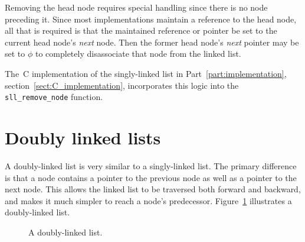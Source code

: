 \documentclass{article}
\begin{document}
  Removing the head node requires special handling since there is no node preceding it. Since most implementations maintain a reference to the head node, all that is required is that the maintained reference or pointer be set to the current head node's \emph{next} node. Then the former head node's \emph{next} pointer may be set to $\phi$ to completely disassociate that node from the linked list.

  The~C implementation of the singly-linked list in Part~\ref{part:implementation}, section~\ref{sect:C_implementation}, incorporates this logic into the \verb|sll_remove_node| function.

  \section{Doubly linked lists}
  A doubly-linked list is very similar to a singly-linked list. The primary difference is that a node contains a pointer to the previous node as well as a pointer to the next node. This allows the linked list to be traversed both forward and backward, and makes it much simpler to reach a node's predecessor. Figure~\ref{fig:doublelinkedlist} illustrates a doubly-linked list.
  \begin{figure}[H]
    \centering
    \caption{A doubly-linked list.}
    \label{fig:doublelinkedlist}
  \end{figure}
\end{document}
